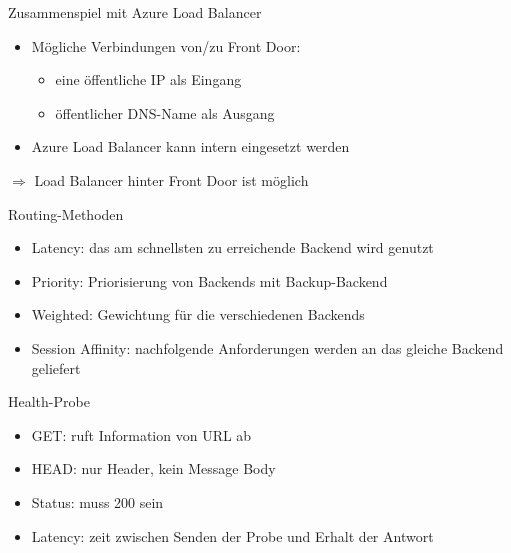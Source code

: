 \begin{flashcard}[Definition]{Zusammenspiel mit Azure Load Balancer}
    \begin{itemize}
        \item Mögliche Verbindungen von/zu Front Door:
            \begin{itemize}
                \item eine öffentliche IP als Eingang
                \item öffentlicher DNS-Name als Ausgang
            \end{itemize}
        \item Azure Load Balancer kann intern eingesetzt werden
    \end{itemize}
    $\Rightarrow$ Load Balancer hinter Front Door ist möglich
\end{flashcard}

\begin{flashcard}[Definition]{Routing-Methoden}
    \begin{itemize}
        \item Latency: das am schnellsten zu erreichende Backend wird genutzt
        \item Priority: Priorisierung von Backends mit Backup-Backend
        \item Weighted: Gewichtung für die verschiedenen Backends
        \item Session Affinity: nachfolgende Anforderungen werden an das gleiche Backend geliefert
    \end{itemize}
\end{flashcard}

\begin{flashcard}[Definition]{Health-Probe}
    \begin{itemize}
        \item GET: ruft Information von URL ab
        \item HEAD: nur Header, kein Message Body
        \item Status: muss 200 sein
        \item Latency: zeit zwischen Senden der Probe und Erhalt der Antwort
    \end{itemize}
\end{flashcard}

